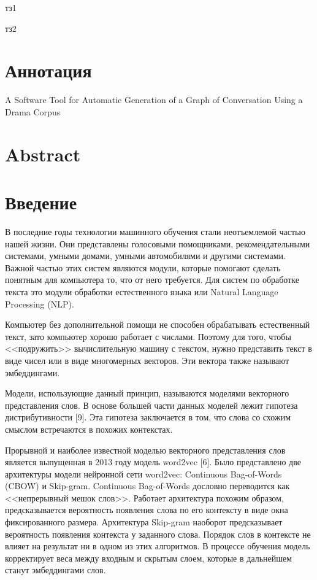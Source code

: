 \documentclass[a4paper,14pt]{article}
\begin{document}
 	
	

\pagebreak

тз1

\pagebreak

тз2	

\pagebreak
	
\section*{\normalsize \hfill Аннотация \hfill}

\sloppy

\begin{center}
	A Software Tool for Automatic Generation of a Graph of Conversation Using a Drama Corpus
\end{center}
\section*{\normalsize \hfill Abstract \hfill}


\newpage

\tableofcontents
\pagebreak

\section*{Введение}


В последние годы технологии машинного обучения стали неотъемлемой частью нашей жизни. 
Они представлены голосовыми помощниками, рекомендательными системами, умными домами, умными автомобилями и другими системами.
Важной частью этих систем являются модули, которые помогают сделать понятным для компьютера то, что от него требуется.
Для систем по обработке текста это модули обработки естественного языка или Natural Language Processing (NLP).

Компьютер без дополнительной помощи не способен обрабатывать естественный текст, зато компьютер хорошо работает с числами.
Поэтому для того, чтобы <<подружить>> вычислительную машину с текстом, нужно представить текст в виде чисел или в виде многомерных векторов.
Эти вектора также называют эмбеддингами.

Модели, использующие данный принцип, называются моделями векторного представления слов.
В основе большей части данных моделей лежит гипотеза дистрибутивности [9].
Эта гипотеза заключается в том, что слова со схожим смыслом встречаются в похожих контекстах.

Прорывной и наиболее известной моделью векторного представления слов является выпущенная в 2013 году модель word2vec [6].
Было представлено две архитектуры модели нейронной сети word2vec: Continuous Bag-of-Words
(CBOW) и Skip-gram. 
Continuous Bag-of-Words дословно переводится как <<непрерывный мешок слов>>.
Работает архитектура похожим образом, предсказывается вероятность появления слова по его контексту в виде окна фиксированного размера.
Архитектура Skip-gram наоборот предсказывает вероятность появления контекста у заданного слова.
Порядок слов в контексте не влияет на результат ни в одном из этих алгоритмов.
В процессе обучения модель корректирует веса между входным и скрытым слоем, которые в дальнейшем станут эмбеддингами слов.
\end{document}
